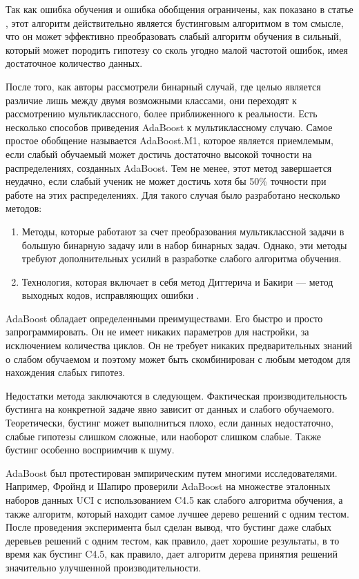 \documentclass{article}
\begin{document}
\begin{articletext}
Так как ошибка обучения и ошибка обобщения ограничены, как показано в статье \cite{Freund 1999}, этот алгоритм действительно является бустинговым алгоритмом в том смысле, что он может эффективно преобразовать слабый алгоритм обучения в сильный, который может породить гипотезу со сколь угодно малой частотой ошибок, имея достаточное количество данных.

После того, как авторы рассмотрели бинарный случай, где целью является различие лишь между двумя возможными классами, они переходят к рассмотрению мультиклассного, более приближенного к реальности. Есть несколько способов приведения AdaBoost к мультиклассному случаю. Самое простое обобщение называется AdaBoost.M1\cite{Freund 1997}, которое является приемлемым, если слабый обучаемый может достичь достаточно высокой точности на распределениях, созданных AdaBoost. Тем не менее, этот метод завершается неудачно, если слабый ученик не может достичь хотя бы 50\% точности при работе на этих  распределениях. Для такого случая было разработано несколько методов:

\begin{enumerate}
\item Методы, которые работают за счет преобразования мультиклассной задачи в большую бинарную задачу или в набор бинарных задач. Однако, эти методы требуют дополнительных усилий в разработке слабого алгоритма обучения.
\item Технология, которая включает в себя метод Диттерича и Бакири --- метод выходных кодов, исправляющих ошибки \cite{Schapire 1997}.
\end{enumerate}

AdaBoost обладает определенными преимуществами. Его быстро и просто запрограммировать. Он не имеет никаких параметров для настройки, за исключением количества циклов. Он не требует никаких предварительных знаний о слабом обучаемом и поэтому может быть скомбинирован с любым методом для нахождения слабых гипотез.

Недостатки метода заключаются в следующем. Фактическая производительность бустинга на конкретной задаче явно зависит от данных и слабого обучаемого. Теоретически, бустинг может выполниться плохо, если данных недостаточно, слабые гипотезы слишком сложные, или наоборот слишком слабые. Также бустинг особенно восприимчив к шуму.

AdaBoost был протестирован эмпирическим путем многими исследователями. Например, Фройнд и Шапиро проверили AdaBoost на множестве эталонных наборов данных UCI \cite{Merz 1998} с использованием C4.5 \cite{Quinlan 1993} как слабого алгоритма обучения, а также алгоритм, который находит самое лучшее дерево решений с одним тестом. После проведения эксперимента был сделан вывод, что бустинг даже слабых деревьев решений с одним тестом, как правило, дает хорошие результаты, в то время как бустинг C4.5, как правило, дает алгоритм дерева принятия решений значительно улучшенной производительности.


\end{articletext}
\end{document}
